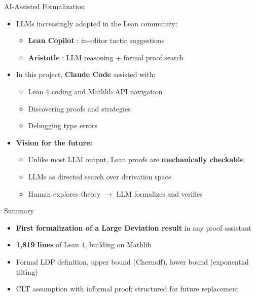 \documentclass[aspectratio=169]{beamer}
\begin{document}
\begin{frame}{AI-Assisted Formalization}
  \begin{itemize}
    \item LLMs increasingly adopted in the Lean community:
      \begin{itemize}
        \item \textbf{Lean Copilot} \cite{song2024leancopilot}: in-editor tactic suggestions
        \item \textbf{Aristotle} \cite{achim2025aristotle}: LLM reasoning + formal proof search
      \end{itemize}

      \vspace{0.3cm}
    \item In this project, \textbf{Claude Code} assisted with:
      \begin{itemize}
        \item Lean 4 coding and Mathlib API navigation
        \item Discovering proofs and strategies
        \item Debugging type errors
      \end{itemize}

      \vspace{0.3cm}
    \item \textbf{Vision for the future:}
      \begin{itemize}
        \item Unlike most LLM output, Lean proofs are \textbf{mechanically checkable}
        \item LLMs as directed search over derivation space
        \item Human explores theory $\longrightarrow$ LLM formalizes and verifies
      \end{itemize}
  \end{itemize}
\end{frame}


\begin{frame}{Summary}
  \begin{itemize}
    \item \textbf{First formalization of a Large Deviation result} in any proof assistant
    \item \textbf{1,819 lines} of Lean 4, building on Mathlib
    \item Formal LDP definition, upper bound (Chernoff), lower bound (exponential tilting)
    \item CLT assumption with informal proof; structured for future replacement
  \end{itemize}
\end{frame}
\end{document}

